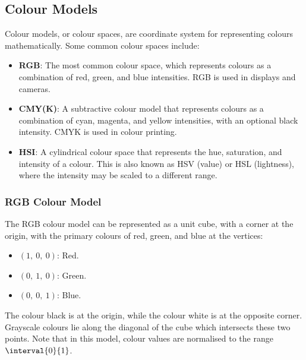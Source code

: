 \documentclass{article}
\begin{document}
\subsection{Colour Models}
Colour models, or colour spaces, are coordinate system for representing
colours mathematically. Some common colour spaces include:
\begin{itemize}
    \item \textbf{RGB}: The most common colour space, which represents
          colours as a combination of red, green, and blue intensities.
          RGB is used in displays and cameras.
    \item \textbf{CMY(K)}: A subtractive colour model that represents
          colours as a combination of cyan, magenta, and yellow
          intensities, with an optional black intensity.
          CMYK is used in colour printing.
    \item \textbf{HSI}: A cylindrical colour space that represents
          the hue, saturation, and intensity of a colour. This is also known
          as HSV (value) or HSL (lightness), where the intensity may be scaled
          to a different range.
\end{itemize}
\subsubsection{RGB Colour Model}
The RGB colour model can be represented as a unit cube, with a corner
at the origin, with the primary colours of red, green, and blue at the
vertices:
\begin{itemize}
    \item \(\left( 1,\: 0,\: 0 \right)\): Red.
    \item \(\left( 0,\: 1,\: 0 \right)\): Green.
    \item \(\left( 0,\: 0,\: 1 \right)\): Blue.
\end{itemize}
The colour black is at the origin, while the colour white is at the
opposite corner. Grayscale colours lie along the diagonal of the cube
which intersects these two points. Note that in this model, colour
values are normalised to the range \(\interval{0}{1}\).
\end{document}

